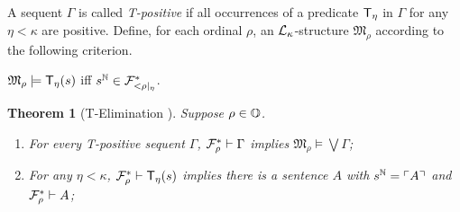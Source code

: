 \documentclass[UKenglish,cleveref,DIV=12]{scrartcl}
\newtheorem{theorem}{Theorem}
\theoremstyle{definition}
\theoremstyle{definition}
\begin{document}
A sequent $\Gamma$ is called {\em T-positive} if all occurrences of a predicate $\mathsf{T}_\eta$ in $\Gamma$ for any $\eta<\kappa$ are positive. Define, for each ordinal $\rho$, an $\mathcal{L}_\kappa$-structure $\mathfrak{M}_\rho$ according to the following criterion.
\begin{center}
 $\mathfrak{M}_\rho\models \mathsf{T}_\eta(s)$ iff $s^\mathbb N\in\mathcal{F}^*_{<\rho|_\eta}$.
\end{center}
\begin{theorem}[T-Elimination ]\label{extlem:FFTElim}\label{extthm:FFTElim} Suppose $\rho\in\mathbb{O}$.
\begin{enumerate}
  \item For every T-positive sequent $\Gamma$, $\mathcal{F}^*_\rho\vdash\Gamma$ implies
	$\mathfrak{M}_\rho\models\bigvee\Gamma$;
  \item For any $\eta<\kappa$, $\mathcal{F}^*_\rho\vdash \mathsf{T}_\eta(s)$ implies there is a
	sentence $A$ with $s^\mathbb N=\ulcorner{A}\urcorner$ and $\mathcal{F}^*_\rho\vdash A$;
\end{enumerate}
\end{theorem}
\end{document}
